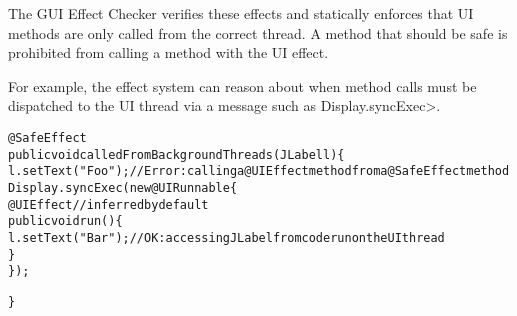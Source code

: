 
The GUI Effect Checker verifies these effects and statically enforces that UI methods are only
called from the correct thread.  A method that should be safe is prohibited from calling a method
with the UI effect. 

For example, the effect system can reason about when method calls must be dispatched to the UI
thread via a message such as \<Display.syncExec>.
\begin{alltt}
@SafeEffect
public void calledFromBackgroundThreads(JLabel l) \{
    l.setText("Foo");       // Error: calling a @UIEffect method from a @SafeEffect method
    Display.syncExec(new @UI Runnable \{
        @UIEffect // inferred by default
        public void run() \{
            l.setText("Bar");  // OK: accessing JLabel from code run on the UI thread
        \}
    \});

\}
\end{alltt}

